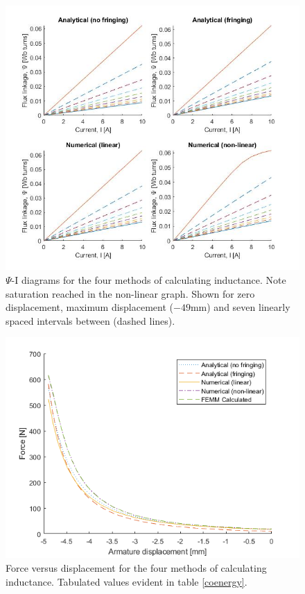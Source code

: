 \documentclass[a4paper]{IEEEtran}
\begin{document}
    \begin{figure}[ht]
        \includegraphics[width = \linewidth]{psi-I-diagrams.jpg}
        \caption{$\Psi$-I diagrams for the four methods of calculating inductance. Note saturation reached in the non-linear graph. Shown for zero displacement, maximum displacement ($-49$mm) and seven linearly spaced intervals between (dashed lines).}
        \label{psi-eye} 
    \end{figure}

    \begin{figure}[ht]
        \includegraphics[width = \linewidth]{F-x.png}
        \caption{Force versus displacement for the four methods of calculating inductance. Tabulated values evident in table \ref{coenergy}.}
        \label{forceGraph} 
    \end{figure}
\end{document}
